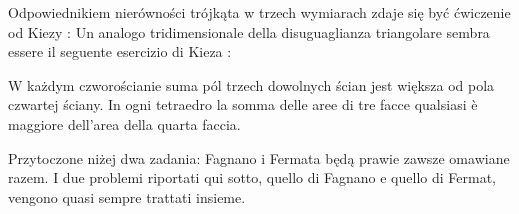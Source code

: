 Odpowiednikiem nierówności trójkąta w trzech wymiarach zdaje się być ćwiczenie od Kiezy \cite[s. 31]{kieza_2017}: %
Un analogo tridimensionale della disuguaglianza triangolare sembra essere il seguente esercizio di Kieza \cite[p.~31]{kieza_2017}: %

\begin{proposition}
	W każdym czworościanie suma pól trzech dowolnych ścian jest większa od pola czwartej ściany. %
	In ogni tetraedro la somma delle aree di tre facce qualsiasi è maggiore dell'area della quarta faccia. %
\end{proposition}

Przytoczone niżej dwa zadania: Fagnano i Fermata będą prawie zawsze omawiane razem. %
I due problemi riportati qui sotto, quello di Fagnano e quello di Fermat, vengono quasi sempre trattati insieme. %




%